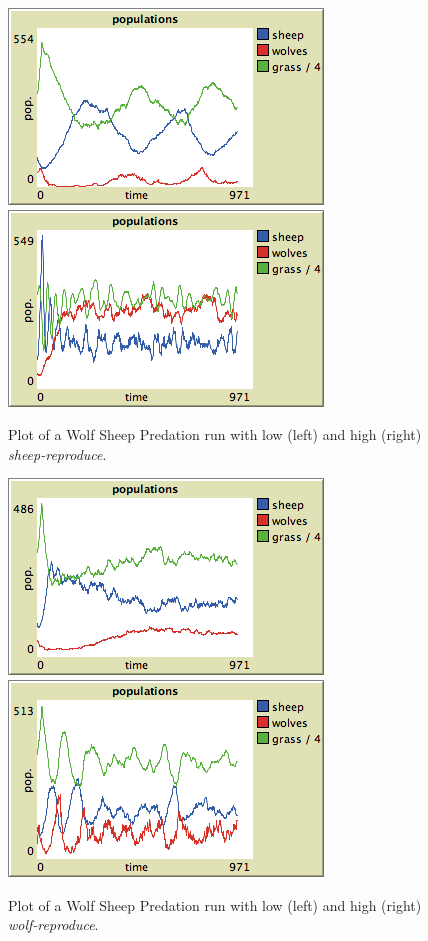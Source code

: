 \begin{figure}[ht]
\centering
\includegraphics[scale=.666667]{images/wolfsheep/sheepsex_low.png}
\includegraphics[scale=.666667]{images/wolfsheep/sheepsex_high.png}
\caption{Plot of a Wolf Sheep Predation run with low (left) and high (right) \textit{sheep-reproduce}.}
\label{fig:wsp_sheepsex}
\end{figure}


\begin{figure}[ht]
\centering
\includegraphics[scale=.666667]{images/wolfsheep/wolfsex_low.png}
\includegraphics[scale=.666667]{images/wolfsheep/wolfsex_high.png}
\caption{Plot of a Wolf Sheep Predation run with low (left) and high (right) \textit{wolf-reproduce}.}
\label{fig:wsp_wolfsex}
\end{figure}


